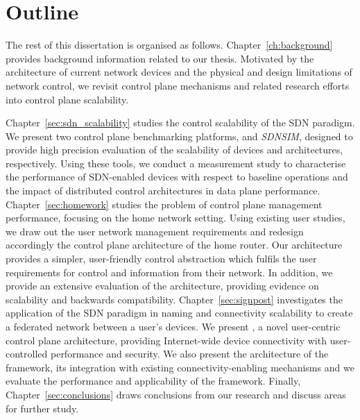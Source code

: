 \section{Outline} \label{sec:intro:outline}

The rest of this dissertation is organised as follows.
Chapter~\ref{ch:background} provides background information related to our
thesis. Motivated by the architecture of current network devices and the
physical and design limitations of network control, we revisit control plane
mechanisms and related research efforts into control plane scalability.  

Chapter~\ref{sec:sdn_scalability} studies the control scalability of the SDN
paradigm.  We present two control plane benchmarking platforms,
\textit{\oflops} and \textit{SDNSIM}, designed to provide high precision
evaluation of the scalability of \of{} devices and architectures, respectively.
Using these tools, we conduct a measurement study to characterise the
performance of SDN-enabled devices with respect to baseline \of{} operations
and the impact of distributed control architectures in data plane performance.
Chapter~\ref{sec:homework} studies the problem of control plane management
performance, focusing on the home network setting. Using existing user studies,
we draw out the user network management requirements and redesign accordingly
the control plane architecture of the home router. Our architecture provides a
simpler, user-friendly control abstraction which fulfils the user requirements
for control and information from their network. In addition, we provide an
extensive evaluation of the architecture, providing evidence on scalability and
backwards compatibility.  Chapter~\ref{sec:signpost} investigates the
application of the SDN paradigm in naming and connectivity scalability to
create a federated network between a user's devices. We present \signpost, a
novel user-centric control plane architecture, providing Internet-wide device
connectivity with user-controlled performance and security. We also present the
architecture of the framework, its integration with existing
connectivity-enabling mechanisms and we evaluate the performance and
applicability of the framework.  Finally, Chapter~\ref{sec:conclusions} draws
conclusions from our research and discuss areas for further study. 
